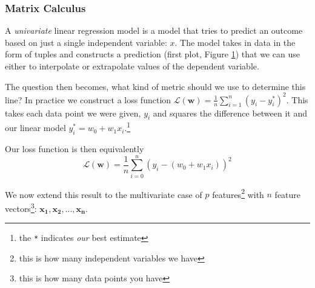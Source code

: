 \documentclass[12pt,dvipsnames,addpoints]{exam}
\renewcommand\vec{\mathbf}
\begin{document}
\subsubsection{Matrix Calculus}
\begin{questions}
    \setcounter{question}{13}
    \question A \emph{univariate} linear regression model is a model that tries to predict an outcome based on just a single independent variable: $x$. The model takes in data in the form of tuples and constructs a prediction (first plot, Figure \hyperref[fig:lwr]{1}) that we can use either to interpolate or extrapolate values of the dependent variable.

    The question then becomes, what kind of metric should we use to determine this line? In practice we construct a loss function $\mathcal{L}(\vec{w}) = \frac{1}{n}\sum_{i=1}^{n} (y_i - y_i^*)^2$. This takes each data point we were given, $y_i$ and squares the difference between it and our linear model $y_i^* = w_0 + w_1 x_i$.\footnote{the \verb|*| indicates \emph{our} best estimate}

    Our loss function is then equivalently \[\mathcal{L}(\vec{w}) = \frac{1}{n}\sum_{i=0}^n (y_i - (w_0 + w_1 x_i))^2\]
    \question We now extend this result to the multivariate case of $p$ features\footnote{this is how many independent variables we have} with $n$ feature vectors\footnote{this is how many data points you have}: $\vec{x_1}, \vec{x_2}, ..., \vec{x_n}$.


\end{questions}
\end{document}
